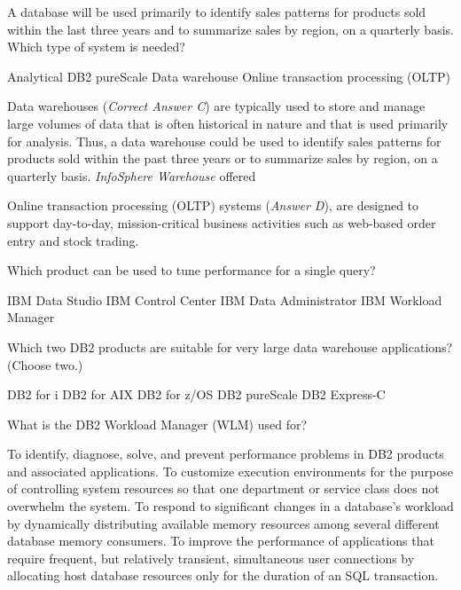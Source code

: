 \documentclass[answers, 11pt]{exam}
\begin{document}
\begin{questions}


\addpoints
\question[1]
A database will be used primarily to identify sales patterns
for products sold within the last three years and to summarize
sales by region, on a quarterly basis. Which type of system is 
needed?
\begin{choices}
\choice Analytical
\choice DB2 pureScale
\CorrectChoice Data warehouse
\choice Online transaction processing (OLTP)
\end{choices}

\begin{solution}
Data warehouses (\textit{Correct Answer C}) are typically used to store and manage large volumes of data that is often
historical in nature and that is used primarily for analysis. Thus, a data warehouse could be used to identify sales patterns
for products sold within the past three years or to summarize sales by region, on a quarterly basis. \textit{InfoSphere Warehouse} offered


\par

Online transaction processing (OLTP) systems (\textit{Answer D}), are designed to support day-to-day, mission-critical business
activities such as web-based order entry and stock trading. \par


\end{solution}

\question[1]
Which product can be used to tune performance for a single query?
\begin{choices}
\choice IBM Data Studio
\choice IBM Control Center
\choice IBM Data Administrator
\choice IBM Workload Manager
\end{choices}

\question[1]
Which two DB2 products are suitable for very large data warehouse applications? (Choose two.)
\begin{choices}
\choice DB2 for i
\choice DB2 for AIX
\choice DB2 for z/OS
\choice DB2 pureScale
\choice DB2 Express-C
\end{choices}

\question[1]
What is the DB2 Workload Manager (WLM) used for?
\begin{choices}
\choice To identify, diagnose, solve, and prevent performance problems in DB2 products and associated applications.
\choice To customize execution environments for the purpose of controlling system resources so that one
		department or service class does not overwhelm the system.
\choice To respond to significant changes in a database's workload by dynamically distributing available memory resources
		among several different database memory consumers.
\choice To improve the performance of applications that require frequent, but relatively transient, simultaneous user
		connections by allocating host database resources only for the duration of an SQL transaction.
\end{choices}


\end{questions}
\end{document}

